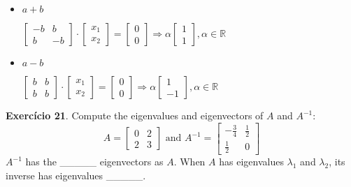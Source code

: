 \documentclass[12pt]{article}
\newcommand{\real}{\mathbb{R}}
\begin{document}
\begin{itemize}
\item $a+b$
  \begin{center}
    $
    \begin{bmatrix}
      -b & b \\
      b & -b
    \end{bmatrix}\cdot
    \begin{bmatrix}
      x_1 \\ x_2
    \end{bmatrix}=
    \begin{bmatrix}
      0 \\ 0
    \end{bmatrix}\Rightarrow \alpha
    \begin{bmatrix}
      1 \\ 1
    \end{bmatrix}, \alpha \in \real
    $
  \end{center}
\item $a-b$
  \begin{center}
    $
    \begin{bmatrix}
      b & b \\
      b & b
    \end{bmatrix}\cdot
    \begin{bmatrix}
      x_1 \\ x_2
    \end{bmatrix}=
    \begin{bmatrix}
      0 \\ 0
    \end{bmatrix}\Rightarrow \alpha
    \begin{bmatrix}
      1 \\ -1
    \end{bmatrix}, \alpha \in \real
    $
  \end{center}
\end{itemize}
\newpage
\textbf{Exercício 21}. Compute the eigenvalues and eigenvectors of $A$ and $A^{-1}$:
$$A = 
\left[
  \begin{matrix}
    0 & 2 \\
    2 & 3
  \end{matrix}    
\right]\text{ and } 
A^{-1} = 
\left[
  \begin{matrix}
    -\frac{3}{4} & \frac{1}{2} \\
    \frac{1}{2} & 0
  \end{matrix}    
\right]
$$
$A^{-1}$ has the \_\_\_\_\_ eigenvectors as $A$. When $A$ has eigenvalues $\lambda_1$ and $\lambda_2$, its inverse has eigenvalues \_\_\_\_\_.\\
\end{document}
